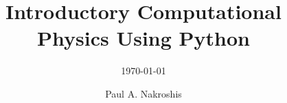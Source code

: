 \documentclass[envcountsame,envcountchap]{usm}
\newcommand{\myTextSize}[3]{\fontsize{#1}{#2}\selectfont #3}
\begin{document}
%
\author{Paul A. Nakroshis}
\title{\textcolor{Cerulean} {\myTextSize{30}{40}{Introductory Computational \\Physics Using Python}}}
\subtitle{\UKmonthdate\today}
\date{}
\maketitle

\frontmatter%

%

\tableofcontents


\mainmatter%
%

%
%


%
%
\appendix



%

\printindex

\end{document}
